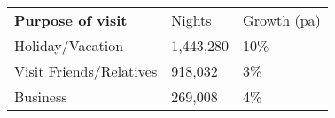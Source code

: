 \begin{tabular}[t]{p{4.8cm}>{\hfill}p{1.3cm}>{\hfill}p{1.4cm}}
 \textbf{Purpose of visit} & Nights & Growth (pa) \\ 
 Holiday/Vacation & 1,443,280 & 10\% \\ 
  Visit Friends/Relatives &   918,032 & 3\% \\ 
  Business &   269,008 & 4\% \\ 
  \end{tabular}

